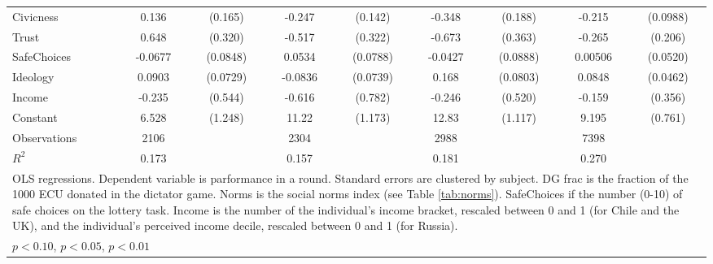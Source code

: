 {\begin{tabular}{l*{4}{cc}}
Civicness       &    0.136         &  (0.165)&   -0.247\sym{*}  &  (0.142)&   -0.348\sym{*}  &  (0.188)&   -0.215\sym{**} & (0.0988)\\
Trust           &    0.648\sym{**} &  (0.320)&   -0.517         &  (0.322)&   -0.673\sym{*}  &  (0.363)&   -0.265         &  (0.206)\\
SafeChoices     &  -0.0677         & (0.0848)&   0.0534         & (0.0788)&  -0.0427         & (0.0888)&  0.00506         & (0.0520)\\
Ideology        &   0.0903         & (0.0729)&  -0.0836         & (0.0739)&    0.168\sym{**} & (0.0803)&   0.0848\sym{*}  & (0.0462)\\
Income          &   -0.235         &  (0.544)&   -0.616         &  (0.782)&   -0.246         &  (0.520)&   -0.159         &  (0.356)\\
Constant        &    6.528\sym{***}&  (1.248)&    11.22\sym{***}&  (1.173)&    12.83\sym{***}&  (1.117)&    9.195\sym{***}&  (0.761)\\
\hline
Observations    &     2106         &         &     2304         &         &     2988         &         &     7398         &         \\
\(R^{2}\)       &    0.173         &         &    0.157         &         &    0.181         &         &    0.270         &         \\
\hline\hline
\multicolumn{9}{l}{\footnotesize OLS regressions. Dependent variable is parformance in a round. Standard errors are clustered by subject. DG frac is the fraction of the 1000 ECU donated in the dictator game. Norms is the social norms index (see Table \ref{tab:norms}). SafeChoices if the number (0-10) of safe choices on the lottery task. Income is the number of the individual's income bracket, rescaled between 0 and 1 (for Chile and the UK), and the individual's perceived income decile, rescaled between 0 and 1 (for Russia).}\\
\multicolumn{9}{l}{\footnotesize \sym{*} \(p<0.10\), \sym{**} \(p<0.05\), \sym{***} \(p<0.01\)}\\
\end{tabular}
}
